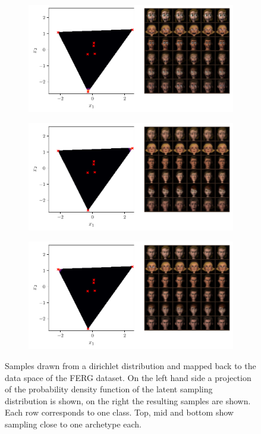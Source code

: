 \begin{figure}[htpb]
	\centering
	\begin{subfigure}[htpb]{\textwidth}
		\centering
		\includegraphics[width=1\linewidth]{figures/samples/aa_ferg1.pdf}
	\end{subfigure}

	\begin{subfigure}[htpb]{\textwidth}
		\centering
		\includegraphics[width=1\linewidth]{figures/samples/aa_ferg2.pdf}
	\end{subfigure}

	\begin{subfigure}[htpb]{\textwidth}
		\centering
		\includegraphics[width=1\linewidth]{figures/samples/aa_ferg3.pdf}
	\end{subfigure}

	\caption{Samples drawn from a dirichlet distribution and mapped back to
		the data space of the FERG dataset. On the left hand side a
		projection of the probability density function of the latent
		sampling distribution is shown, on the right the resulting samples
		are shown. Each row corresponds to one class. Top, mid and bottom show
		sampling close to one archetype each.}%
	\label{fig:aa_ferg_corners}
\end{figure}

